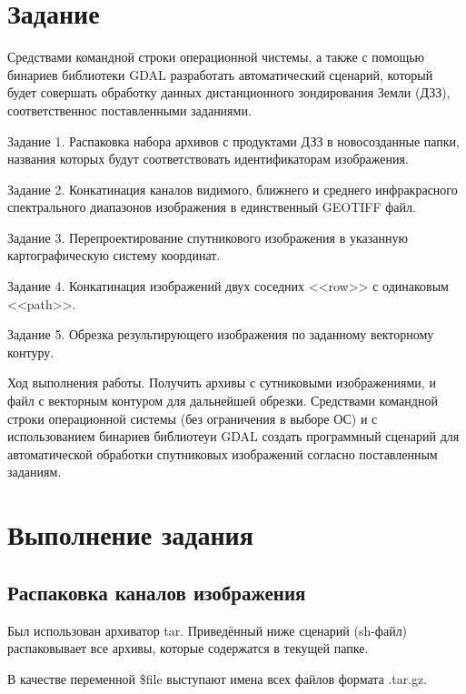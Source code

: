 \chapter{Задание}

Средствами командной строки операционной чистемы, а также с помощью бинариев библиотеки GDAL разработать автоматический сценарий, который будет совершать обработку данных дистанционного зондирования Земли (ДЗЗ), соответственнос поставленными заданиями.

Задание 1. Распаковка набора архивов с продуктами ДЗЗ в новосозданные папки, названия которых будут соответствовать идентификаторам изображения.

Задание 2. Конкатинация каналов видимого, ближнего и среднего инфракрасного спектрального диапазонов изображения в единственный GEOTIFF файл.

Задание 3. Перепроектирование спутникового изображения в указанную картографическую систему координат.

Задание 4. Конкатинация изображений двух соседних <<row>> с одинаковым <<path>>.

Задание 5. Обрезка результирующего изображения по заданному векторному контуру.

Ход выполнения работы. Получить архивы с сутниковыми изображениями, и файл с векторным контуром для дальнейшей обрезки. Средствами командной строки операционной системы (без ограничения в выборе ОС) и с использованием бинариев библиотеуи GDAL создать программный сценарий для автоматической обработки спутниковых изображений согласно поставленным заданиям. 

\chapter{Выполнение задания}

\section{Распаковка каналов изображения}

Был использован архиватор tar. Приведённый ниже сценарий (sh-файл) распаковывает все архивы, которые содержатся в текущей папке.

\lstset{inputencoding=utf8, extendedchars=\true}


В качестве переменной \$file выступают имена всех файлов формата .tar.gz.


